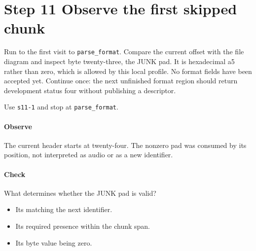\section{Step 11 Observe the first skipped chunk}\label{pcm-wav-s11}
Run to the first visit to \texttt{parse\_format}. Compare the current offset with the file diagram and inspect byte twenty-three, the JUNK pad. It is hexadecimal a5 rather than zero, which is allowed by this local profile. No format fields have been accepted yet. Continue once: the next unfinished format region should return development status four without publishing a descriptor.

Use \texttt{s11-1} and stop at \texttt{parse\_format}.

\paragraph{Observe} The current header starts at twenty-four. The nonzero pad was consumed by its position, not interpreted as audio or as a new identifier.

\paragraph{Check} What determines whether the JUNK pad is valid?
\begin{itemize}
  \item[A.] Its matching the next identifier.
  \item[B.] Its required presence within the chunk span.
  \item[C.] Its byte value being zero.
\end{itemize}
